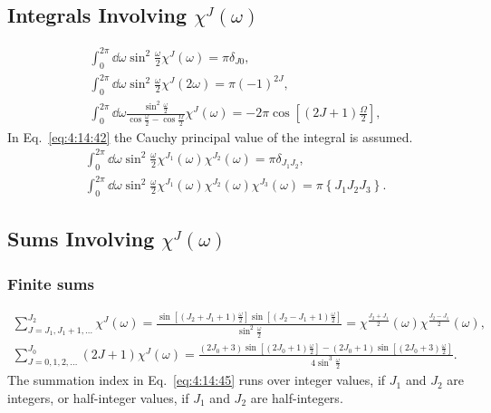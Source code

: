 \subsection{Integrals Involving $\chi^{J}(\omega)$}\label{sec:4.14.8}
\begin{gather}
\int_{0}^{2 \pi} \dd \omega \sin ^{2} \frac{\omega}{2} \chi^{J}(\omega)=\pi \delta_{J 0}  ,\label{eq:4:14:40}\\
\int_{0}^{2 \pi} \dd \omega \sin ^{2} \frac{\omega}{2} \chi^{J}(2 \omega)=\pi(-1)^{2 J} , \label{eq:4:14:41}\\
\int_{0}^{2 \pi} \dd \omega \frac{\sin ^{2} \frac{\omega}{2}}{\cos \frac{\omega}{2}-\cos \frac{\Omega}{2}} \chi^{J}(\omega)=-2 \pi \cos \left[(2 J+1) \frac{\Omega}{2}\right] ,\label{eq:4:14:42}
\end{gather}
In Eq.~\eqref{eq:4:14:42} the Cauchy principal value of the integral is assumed.
\begin{gather}
\int_{0}^{2 \pi} \dd \omega \sin ^{2} \frac{\omega}{2} \chi^{J_{1}}(\omega) \chi^{J_{2}}(\omega)=\pi \delta_{J_{1} J_{2}} , \label{eq:4:14:43}\\
\int_{0}^{2 \pi} \dd \omega \sin ^{2} \frac{\omega}{2} \chi^{J_{1}}(\omega) \chi^{J_{2}}(\omega) \chi^{J_{3}}(\omega)=\pi\left\{J_{1} J_{2} J_{3}\right\} .\label{eq:4:14:44}
\end{gather}
\subsection{Sums Involving $\chi^{J}(\omega)$}\label{sec:4.14.9}
\subsubsection{ Finite sums}
\begin{gather}
\sum_{J=J_{1}, J_{1}+1, \ldots}^{J_{2}} \chi^{J}(\omega)=\frac{\sin \left[\left(J_{2}+J_{1}+1\right) \frac{\omega}{2}\right] \sin \left[\left(J_{2}-J_{1}+1\right) \frac{\omega}{2}\right]}{\sin ^{2} \frac{\omega}{2}}=\chi^{\frac{J_{2}+J_{1}}{2}}(\omega) \chi^{\frac{J_{2}-J_{1}}{2}}(\omega) , \label{eq:4:14:45}\\
\sum_{J=0,1,2, \ldots}^{J_{0}}(2 J+1) \chi^{J}(\omega)=\frac{\left(2 J_{0}+3\right) \sin \left[\left(2 J_{0}+1\right) \frac{\omega}{2}\right]-\left(2 J_{0}+1\right) \sin \left[\left(2 J_{0}+3\right) \frac{\omega}{2}\right]}{4 \sin ^{3} \frac{\omega}{2}} .\label{eq:4:14:46}
\end{gather}
The summation index in Eq.~\eqref{eq:4:14:45} runs over integer values, if $J_{1}$ and $J_{2}$ are integers, or half-integer values, if $J_{1}$ and $J_{2}$ are half-integers.

